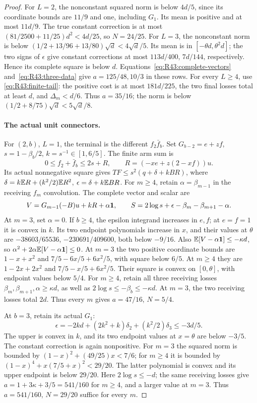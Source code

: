 \begin{proof}
For \(L=2\), the nonconstant squared norm is below \(4d/5\),
since its coordinate bounds are \(11/9\) and one, including \(G_1\).
Its mean is positive and at most \(11d/9\). The true constant correction
is at most \((81/2500+11/25)d^2<4d/25\), so \(N=24/25\).
For \(L=3\), the nonconstant norm is below
\((1/2+13/96+13/80)\sqrt d<4\sqrt d/5\).
Its mean is in \([-\theta d,\theta^2d]\); the two signs of
\(\epsilon\) give constant corrections at most
\(113d/400\), \(7d/144\), respectively. Hence its complete
square is below \(d\). Equations~\eqref{eq:R43:complete-vectors}
and~\eqref{eq:R43:three-data} give \(a=125/48,10/3\) in these rows.
For every \(L\ge4\), use \eqref{eq:R43:finite-tail}:
the positive cost is at most \(181d/225\), the two final losses total
at least \(d\), and \(\Delta_m<d/6\). Thus \(a=35/16\);
the norm is below \((1/2+8/75)\sqrt d<5\sqrt d/8\).

\paragraph{The actual unit connectors.}\label{part:R43:unit}
For \((2,b)\), \(L=1\), the terminal is the different
\(f_2\bar f_b\). Set \(G_{b-2}=e+zf\),
\(s=1-\beta_b/2\), \(k=s^{-1}\in[1,6/5]\). The finite arm sum is
\[
 0\le f_2+\bar f_b\le2s+R,\qquad
 R=(-xe+z(2-xf))u.
\]
Its actual nonnegative square gives
\(TF\le s^2(q+\delta+kBR)\), where
\(\delta=k\mathbb E R+(k^2/2)\mathbb E R^2\), \(\epsilon=\delta+k\mathbb E BR\).
For \(m\ge4\), retain \(\alpha=\beta_{m-1}\) in the receiving
\(f_m\) convolution. The complete vector and scalar are
\[
 V=G_{m-1}(-B)u+kR+\alpha\mathbf1,\qquad
 S=2\log s+\epsilon-\beta_m-\beta_{m+1}-\alpha.
\]
At \(m=3\), set \(\alpha=0\). If \(b\ge4\), the epsilon
integrand increases in \(e,f\); at \(e=f=1\) it is convex in \(k\).
Its two endpoint polynomials increase in \(x\), and their values at
\(\theta\) are \(-38603/65536\), \(-230691/409600\), both
below \(-9/16\). Also \(\mathbb E[V-\alpha\mathbf1]\le-\kappa d\), so
\(\alpha^2+2\alpha\mathbb E[V-\alpha\mathbf1]\le0\).
At \(m=3\) the two positive coordinate bounds are
\(1-x+x^2\) and \(7/5-6x/5+6x^2/5\), with square below \(6/5\).
At \(m\ge4\) they are \(1-2x+2x^2\) and
\(7/5-x/5+6x^2/5\). Their square is convex on \([0,\theta]\),
with endpoint values below \(5/4\). For \(m\ge4\), retain all
three receiving losses \(\beta_m,\beta_{m+1},\alpha\ge\kappa d\),
as well as \(2\log s\le-\beta_b\le-\kappa d\).
At \(m=3\), the two receiving losses total \(2d\).
Thus every \(m\) gives \(a=47/16\), \(N=5/4\).

At \(b=3\), retain its actual \(G_1\):
\[
 \epsilon=-2kd+(2k^2+k)\delta_2+(k^2/2)\delta_3\le-3d/5.
\]
The upper is convex in \(k\), and its two endpoint values at \(x=\theta\)
are below \(-3/5\). The constant correction is again nonpositive.
For \(m=3\) the squared norm is bounded by
\((1-x)^2+(49/25)x<7/6\); for \(m\ge4\) it is bounded by
\((1-x)^4+x(7/5+x)^2<29/20\). The latter polynomial is convex
and its upper endpoint is below \(29/20\). Here \(2\log s\le-d\);
the same receiving losses give \(a=1+3\kappa+3/5=541/160\)
for \(m\ge4\), and a larger value at \(m=3\).
Thus \(a=541/160\), \(N=29/20\) suffice for every \(m\).


\end{proof}
